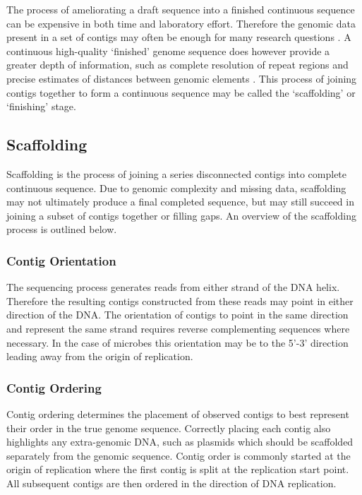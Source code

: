 \documentclass[10pt]{bmc_article}
\newenvironment{bmcformat}{\begin{raggedright}\baselineskip20pt\sloppy\setboolean{publ}{false}}{\end{raggedright}\baselineskip20pt\sloppy}
\begin{document}
\begin{bmcformat}
The process of ameliorating a draft sequence into a finished continuous
sequence can be expensive in both time and laboratory effort. Therefore the
genomic data present in a set of contigs may often be enough for many research
questions \cite{branscomb2002}. A continuous high-quality `finished' genome
sequence does however provide a greater depth of information, such as complete
resolution of repeat regions and precise estimates of distances between genomic
elements \cite{parkhill2002,fraser2002}. This process of joining contigs
together to form a continuous sequence may be called the `scaffolding' or
`finishing' stage. \pb

\subsection*{Scaffolding} %

Scaffolding is the process of joining a series disconnected contigs into
complete continuous sequence. Due to genomic complexity and missing data,
scaffolding may not ultimately produce a final completed sequence, but may
still succeed in joining a subset of contigs together or filling gaps. An
overview of the scaffolding process is outlined below.

\subsubsection*{Contig Orientation} %

The sequencing process generates reads from either strand of the DNA helix.
Therefore the resulting contigs constructed from these reads may point in
either direction of the DNA. The orientation of contigs to point in the same
direction and represent the same strand requires reverse complementing
sequences where necessary. In the case of microbes this orientation may be to
the 5'-3' direction leading away from the origin of replication.

\subsubsection*{Contig Ordering} %

Contig ordering determines the placement of observed contigs to best represent
their order in the true genome sequence. Correctly placing each contig also
highlights any extra-genomic DNA, such as plasmids which should be scaffolded
separately from the genomic sequence. Contig order is commonly started at the
origin of replication where the first contig is split at the replication start
point. All subsequent contigs are then ordered in the direction of DNA
replication.


\end{bmcformat}
\end{document}

